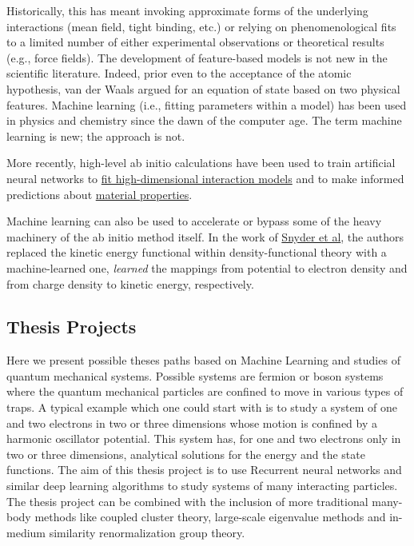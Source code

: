 \documentclass[%
oneside,                 %
final,                   %
10pt]{article}
\begin{document}
Historically, this has meant invoking
approximate forms of the underlying interactions (mean field, tight
binding, etc.) or relying on phenomenological fits to a limited number
of either experimental observations or theoretical results (e.g., force fields). 
The development of feature-based models is not
new in the scientific literature. Indeed, prior even to the acceptance
of the atomic hypothesis, van der Waals argued for an equation of
state based on two physical features. Machine learning (i.e.,
fitting parameters within a model) has been used in physics and
chemistry since the dawn of the computer age. The term machine
learning is new; the approach is not.

More recently, high-level ab initio calculations have been used to
train artificial neural networks to \href{{http://www.sciencedirect.com/science/article/pii/S0927025615007806?via%
models}  and to make informed predictions about \href{{https://www.nature.com/articles/srep40827}}{material properties}. 

Machine learning can also be used to accelerate or bypass some of the
heavy machinery of the ab initio method itself. In the work of \href{{https://journals.aps.org/prl/abstract/10.1103/PhysRevLett.108.253002}}{Snyder et al},  the authors
replaced the kinetic energy functional within density-functional
theory with a machine-learned one, 
\emph{learned} the mappings from potential to electron density and from
charge density to kinetic energy, respectively.

\subsection*{Thesis Projects}

Here we present possible theses paths based on Machine Learning and
studies of quantum mechanical systems.  Possible systems are fermion
or boson systems where the quantum mechanical particles are confined
to move in various types of traps. A typical example which one could
start with is to study a system of one and two electrons in two or
three dimensions whose motion is confined by a harmonic oscillator
potential. This system has, for one and two electrons only in two or
three dimensions, analytical solutions for the energy and the state
functions. The aim of this thesis project is to use Recurrent neural
networks and similar deep learning algorithms to study systems of many
interacting particles.  The thesis project can be combined with the inclusion of more traditional many-body methods like
coupled cluster theory, large-scale eigenvalue methods and in-medium similarity renormalization group theory.
\end{document}
